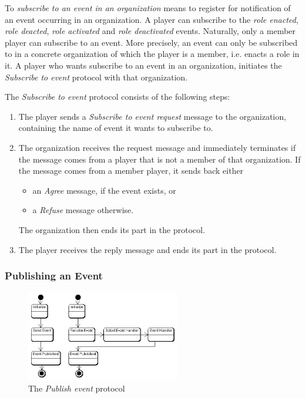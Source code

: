 To \textit{subscribe to an event in an organization} means to register for notification of an event occurring in an organization.
A player can subscribe to the \textit{role enacted}, \textit{role deacted}, \textit{role activated} and \textit{role deactivated} events.
Naturally, only a member player can subscribe to an event.
More precisely, an event can only be subscribed to in a concrete organization of which the player is a member, i.e. enacts a role in it.
A player who wants subscribe to an event in an organization, initiates the \textit{Subscribe to event} protocol with that organization.

The \textit{Subscribe to event} protocol consists of the following steps:
\begin{enumerate}
	\item The player sends a \textit{Subscribe to event request} message to the organization, containing the name of event it wants to subscribe to.
	\item The organization receives the request message and immediately terminates if the message comes from a player that is not a member of that organization.
	If the message comes from a member player, it sends back either
	\begin{itemize}
		\item an \textit{Agree} message, if the event exists, or
		\item a \textit{Refuse} message otherwise. 
	\end{itemize}
	The organization then ends its part in the protocol.
	\item The player receives the reply message and ends its part in the protocol.
\end{enumerate}

\subsubsection{Publishing an Event}

\begin{figure}[ht]
	\centering
	\includegraphics[width=0.6\textwidth]{images/thespian/publish-event-protocol.png}
	\caption{The \textit{Publish event} protocol}
	\label{figure:thespian-publish-event-protocol}
\end{figure}

